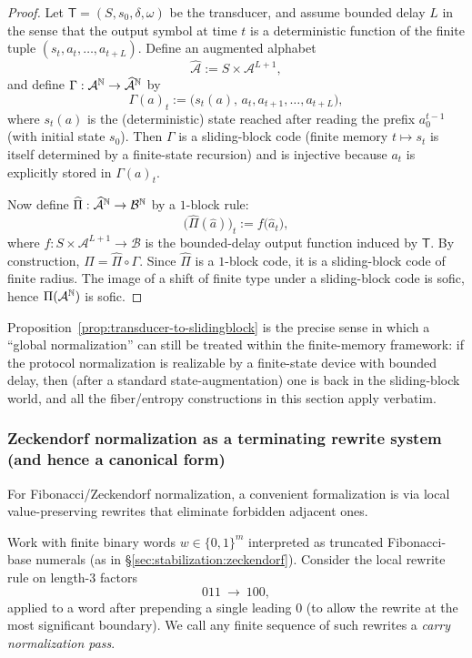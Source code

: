 \begin{proof}
Let $\mathsf{T}=(S,s_0,\delta,\omega)$ be the transducer, and assume bounded delay $L$ in the sense that the output symbol at time $t$ is a deterministic function of the finite tuple $(s_t,a_t,\dots,a_{t+L})$.
Define an augmented alphabet
\[
\widehat{\mathcal{A}}:=S\times \mathcal{A}^{L+1},
\]
and define $\Gamma:\mathcal{A}^{\mathbb{N}}\to\widehat{\mathcal{A}}^{\mathbb{N}}$ by
\[
\Gamma(a)_t := \bigl(s_t(a),\,a_t,a_{t+1},\dots,a_{t+L}\bigr),
\]
where $s_t(a)$ is the (deterministic) state reached after reading the prefix $a_0^{t-1}$ (with initial state $s_0$).
Then $\Gamma$ is a sliding-block code (finite memory $t\mapsto s_t$ is itself determined by a finite-state recursion) and is injective because $a_t$ is explicitly stored in $\Gamma(a)_t$.

Now define $\widehat{\Pi}:\widehat{\mathcal{A}}^{\mathbb{N}}\to\mathcal{B}^{\mathbb{N}}$ by a $1$-block rule:
\[
\bigl(\widehat{\Pi}(\hat a)\bigr)_t := f\bigl(\hat a_t\bigr),
\]
where $f:S\times\mathcal{A}^{L+1}\to\mathcal{B}$ is the bounded-delay output function induced by $\mathsf{T}$.
By construction, $\Pi=\widehat{\Pi}\circ\Gamma$. Since $\widehat{\Pi}$ is a $1$-block code, it is a sliding-block code of finite radius.
The image of a shift of finite type under a sliding-block code is sofic, hence $\Pi(\mathcal{A}^{\mathbb{N}})$ is sofic.
\end{proof}

\begin{remark}
Proposition~\ref{prop:transducer-to-slidingblock} is the precise sense in which a ``global normalization'' can still be treated within the finite-memory framework: if the protocol normalization is realizable by a finite-state device with bounded delay, then (after a standard state-augmentation) one is back in the sliding-block world, and all the fiber/entropy constructions in this section apply verbatim.
\end{remark}

\subsubsection{Zeckendorf normalization as a terminating rewrite system (and hence a canonical form)}\label{sec:stabilization:zeckendorf-rewrite}

For Fibonacci/Zeckendorf normalization, a convenient formalization is via local value-preserving rewrites that eliminate forbidden adjacent ones.

\begin{definition}\label{def:zeckendorf-rewrite}
Work with finite binary words $w\in\{0,1\}^m$ interpreted as truncated Fibonacci-base numerals (as in \S\ref{sec:stabilization:zeckendorf}). Consider the local rewrite rule on length-$3$ factors
\[
011\ \longrightarrow\ 100,
\]
applied to a word after prepending a single leading $0$ (to allow the rewrite at the most significant boundary).
We call any finite sequence of such rewrites a \emph{carry normalization pass}.
\end{definition}

